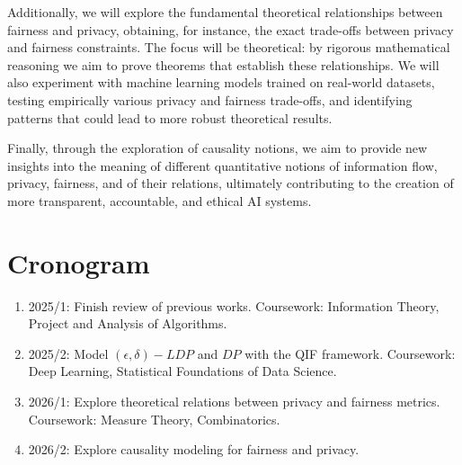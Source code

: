 \documentclass[12pt]{article}
\begin{document}
Additionally, we will explore the fundamental theoretical relationships between fairness and privacy, obtaining, for instance, the exact trade-offs between privacy and fairness constraints. The focus will be theoretical: by rigorous mathematical reasoning we aim to prove theorems that establish these relationships. We will also experiment with machine learning models trained on real-world datasets, testing empirically various privacy and fairness trade-offs, and identifying patterns that could lead to more robust theoretical results.

Finally, through the exploration of causality notions\cite{Causality}, we aim to provide new insights into the meaning of different quantitative notions of information flow, privacy, fairness, and of their relations, ultimately contributing to the creation of more transparent, accountable, and ethical AI systems.

\section{Cronogram}

\begin{enumerate}
\item 2025/1: Finish review of previous works. Coursework: Information Theory, Project and Analysis of Algorithms.
\item 2025/2: Model $(\epsilon,\delta)-LDP$ and $DP$ with the QIF framework. Coursework: Deep Learning, Statistical Foundations of Data Science.
\item 2026/1: Explore theoretical relations between privacy and fairness metrics. Coursework: Measure Theory, Combinatorics.
\item 2026/2: Explore causality modeling for fairness and privacy.
\end{enumerate}




\end{document}
